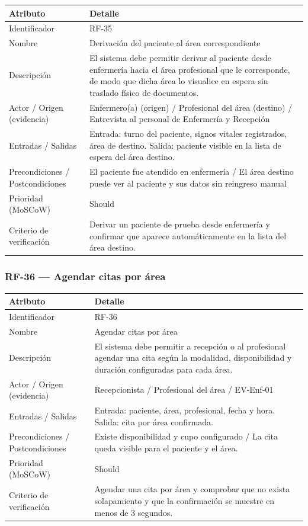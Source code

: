 \documentclass[11pt,a4paper]{article}
\begin{document}
	\begin{longtable}{p{} p{}}
		
		\toprule
		\textbf{Atributo} & \textbf{Detalle} \\
		\midrule
		\endhead
		
		Identificador & RF-35  \\
		Nombre & Derivación del paciente al área correspondiente \\
		Descripción & El sistema debe permitir derivar al paciente desde enfermería hacia el área profesional que le corresponde, de modo que dicha área lo visualice en espera sin traslado físico de documentos. \\
		Actor / Origen (evidencia) & Enfermero(a) (origen) / Profesional del área (destino) / Entrevista al personal de Enfermería y Recepción \\
		Entradas / Salidas & Entrada: turno del paciente, signos vitales registrados, área de destino. Salida: paciente visible en la lista de espera del área destino. \\
		Precondiciones / Postcondiciones & El paciente fue atendido en enfermería / El área destino puede ver al paciente y sus datos sin reingreso manual \\
		Prioridad (MoSCoW) & Should \\
		Criterio de verificación & Derivar un paciente de prueba desde enfermería y confirmar que aparece automáticamente en la lista del área destino. \\
		\bottomrule
	\end{longtable}
	
	\subsubsection{RF-36 --- Agendar citas por área}
	\begin{longtable}{p{} p{}}
		\toprule
		\textbf{Atributo} & \textbf{Detalle} \\
		\midrule
		\endhead
		Identificador & RF-36 \\
		Nombre & Agendar citas por área \\
		Descripción & El sistema debe permitir a recepción o al profesional agendar una cita según la modalidad, disponibilidad y duración configuradas para cada área. \\
		Actor / Origen (evidencia) & Recepcionista / Profesional del área / EV-Enf-01 \\
		Entradas / Salidas & Entrada: paciente, área, profesional, fecha y hora. Salida: cita por área confirmada. \\
		Precondiciones / Postcondiciones & Existe disponibilidad y cupo configurado / La cita queda visible para el paciente y el área. \\
		Prioridad (MoSCoW) & Should \\
		Criterio de verificación & Agendar una cita por área y comprobar que no exista solapamiento y que la confirmación se muestre en menos de 3 segundos. \\
		\bottomrule
	\end{longtable}
	
\end{document}
